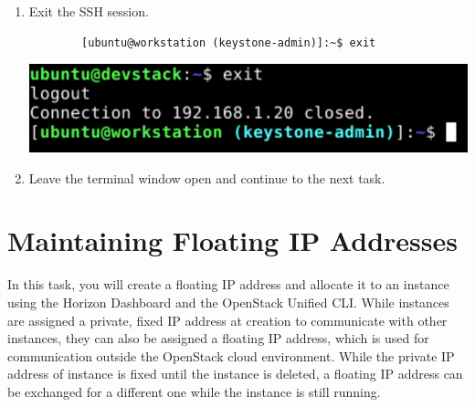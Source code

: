 \documentclass[letterpaper, 12pt]{article}
\begin{document}
\begin{enumerate}
    \item Exit the SSH session.
    \begin{lstlisting}
        [ubuntu@workstation (keystone-admin)]:~$ exit
    \end{lstlisting}

    \begin{center}
        \includegraphics[width=\linewidth]{images/part2/step18.png}
    \end{center}

    \item Leave the terminal window open and continue to the next task.

\end{enumerate}

\section{Maintaining Floating IP Addresses}
\label{sec:maintaining_floating_ip_addresses}
In this task, you will create a floating IP address and allocate it to an instance using the Horizon Dashboard and the OpenStack Unified CLI.
While instances are assigned a private, fixed IP address at creation to communicate with other instances, they can also be assigned a floating IP address, which is used for communication outside the OpenStack cloud environment.
While the private IP address of instance is fixed until the instance is deleted, a floating IP address can be exchanged for a different one while the instance is still running.
\end{document}
